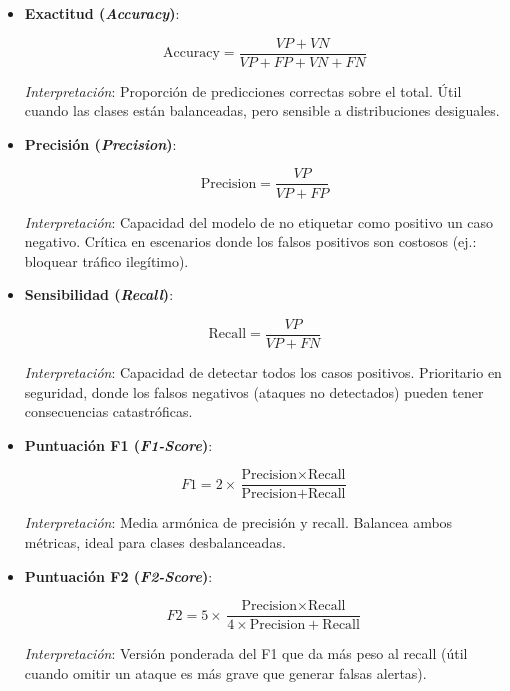 \begin{itemize}
    \item \textbf{Exactitud (\textit{Accuracy})}: \label{met:Accuracy}
    
    \begin{equation}
        \text{Accuracy} = \frac{VP + VN}{VP + FP + VN + FN}
    \end{equation}
    
    \textit{Interpretación}: Proporción de predicciones correctas sobre el total. Útil cuando las clases están balanceadas, pero sensible a distribuciones desiguales.
    

    \item \textbf{Precisión (\textit{Precision})}: \label{met:Precision}
    
    \begin{equation}
        \text{Precision} = \frac{VP}{VP + FP}
    \end{equation}
    
    \textit{Interpretación}: Capacidad del modelo de no etiquetar como positivo un caso negativo. Crítica en escenarios donde los falsos positivos son costosos (ej.: bloquear tráfico ilegítimo).


    \item \textbf{Sensibilidad (\textit{Recall})}: \label{met:Recall}
    
    \begin{equation}
        \text{Recall} = \frac{VP}{VP + FN}
    \end{equation}
    
    \textit{Interpretación}: Capacidad de detectar todos los casos positivos. Prioritario en seguridad, donde los falsos negativos (ataques no detectados) pueden tener consecuencias catastróficas.
    

    \item \textbf{Puntuación F1 (\textit{F1-Score})}: \label{met:F1-score}
    
    \begin{equation}
        F1 = 2 \times \frac{\text{Precision} \times \text{Recall}}{\text{Precision} + \text{Recall}}
    \end{equation}
    
    \textit{Interpretación}: Media armónica de precisión y recall. Balancea ambos métricas, ideal para clases desbalanceadas.
    

    \item \textbf{Puntuación F2 (\textit{F2-Score})}: \label{met:F2-score}
    
    \begin{equation}
        F2 = 5 \times \frac{\text{Precision} \times \text{Recall}}{4 \times \text{Precision} + \text{Recall}}
    \end{equation}
    
    \textit{Interpretación}: Versión ponderada del F1 que da más peso al recall (útil cuando omitir un ataque es más grave que generar falsas alertas).
\end{itemize}


